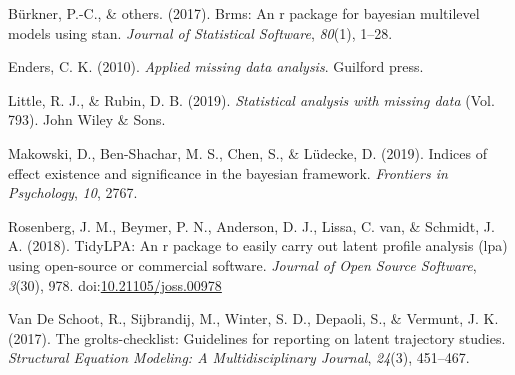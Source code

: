 \documentclass[man]{apa6}
\begin{document}
\leavevmode\hypertarget{ref-burkner2017}{}%
Bürkner, P.-C., \& others. (2017). Brms: An r package for bayesian multilevel models using stan. \emph{Journal of Statistical Software}, \emph{80}(1), 1--28.

\leavevmode\hypertarget{ref-enders2010applied}{}%
Enders, C. K. (2010). \emph{Applied missing data analysis}. Guilford press.

\leavevmode\hypertarget{ref-little2019statistical}{}%
Little, R. J., \& Rubin, D. B. (2019). \emph{Statistical analysis with missing data} (Vol. 793). John Wiley \& Sons.

\leavevmode\hypertarget{ref-makowski2019}{}%
Makowski, D., Ben-Shachar, M. S., Chen, S., \& Lüdecke, D. (2019). Indices of effect existence and significance in the bayesian framework. \emph{Frontiers in Psychology}, \emph{10}, 2767.

\leavevmode\hypertarget{ref-R-tidyLPA}{}%
Rosenberg, J. M., Beymer, P. N., Anderson, D. J., Lissa, C. van, \& Schmidt, J. A. (2018). TidyLPA: An r package to easily carry out latent profile analysis (lpa) using open-source or commercial software. \emph{Journal of Open Source Software}, \emph{3}(30), 978. doi:\href{https://doi.org/10.21105/joss.00978}{10.21105/joss.00978}

\leavevmode\hypertarget{ref-van2017grolts}{}%
Van De Schoot, R., Sijbrandij, M., Winter, S. D., Depaoli, S., \& Vermunt, J. K. (2017). The grolts-checklist: Guidelines for reporting on latent trajectory studies. \emph{Structural Equation Modeling: A Multidisciplinary Journal}, \emph{24}(3), 451--467.

\endgroup
\end{document}
